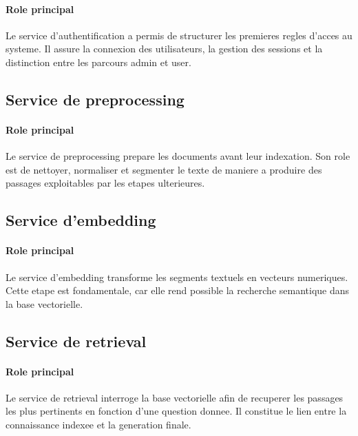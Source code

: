 \paragraph{Role principal}

Le service d'authentification a permis de structurer les premieres regles d'acces au systeme. Il assure la connexion des utilisateurs, la gestion des sessions et la distinction entre les parcours admin et user.

\subsection{Service de preprocessing}

\paragraph{Role principal}

Le service de preprocessing prepare les documents avant leur indexation. Son role est de nettoyer, normaliser et segmenter le texte de maniere a produire des passages exploitables par les etapes ulterieures.

\subsection{Service d'embedding}

\paragraph{Role principal}

Le service d'embedding transforme les segments textuels en vecteurs numeriques. Cette etape est fondamentale, car elle rend possible la recherche semantique dans la base vectorielle.

\subsection{Service de retrieval}

\paragraph{Role principal}

Le service de retrieval interroge la base vectorielle afin de recuperer les passages les plus pertinents en fonction d'une question donnee. Il constitue le lien entre la connaissance indexee et la generation finale.

